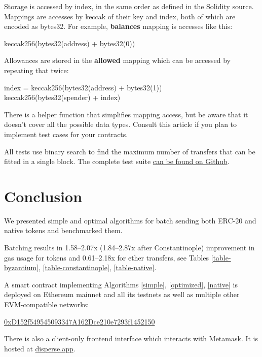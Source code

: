 \documentclass[12pt]{article}
\begin{document}
Storage is accessed by index, in the same order as defined in the Solidity source.
Mappings are accesses by keccak of their key and index, both of which are encoded as bytes32.
For example, \textbf{balances} mapping is accesses like this:
\begin{center}
	keccak256(bytes32(address) + bytes32(0))	
\end{center}

Allowances are stored in the \textbf{allowed} mapping which can be accessed by repeating that twice:
\begin{center}
index = keccak256(bytes32(address) + bytes32(1)) \\
keccak256(bytes32(spender) + index)	
\end{center}

There is a helper function that simplifies mapping access, but be aware that it doesn't cover all the possible data types.
Consult this article\cite{read-storage} if you plan to implement test cases for your contracts.

All tests use binary search to find the maximum number of transfers that can be fitted in a single block.
The complete test suite \href{https://github.com/banteg/disperse-reseach}{can be found on Github}.

\section{Conclusion}

We presented simple and optimal algorithms for batch sending both ERC-20 and native tokens and benchmarked them.

Batching results in 1.58--2.07x (1.84--2.87x after Constantinople) improvement in gas usage for tokens and 0.61--2.18x for ether transfers, see Tables \ref{table-byzantium}, \ref{table-constantinople}, \ref{table-native}.

A smart contract implementing Algorithms \ref{simple}, \ref{optimized}, \ref{native} is deployed on Ethereum mainnet and all its testnets as well as multiple other EVM-compatible networks:

\begin{center}
\href{https://etherscan.io/address/0xD152f549545093347A162Dce210e7293f1452150}{0xD152f549545093347A162Dce210e7293f1452150}	
\end{center}

There is also a client-only frontend interface which interacts with Metamask. It is hosted at \href{https://disperse.app/}{disperse.app}.
\end{document}
